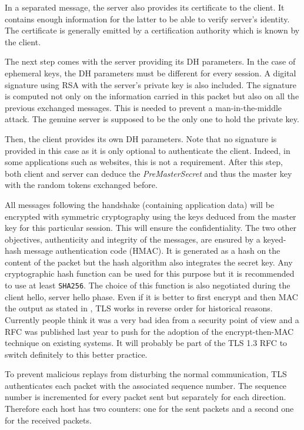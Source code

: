 In a separated message, the server also provides its certificate to the client. It contains enough information for the latter to be able to verify server's identity. The certificate is generally emitted by a certification authority which is known by the client.

The next step comes with the server providing its DH parameters. In the case of ephemeral keys, the DH parameters must be different for every session. A digital signature using RSA with the server's private key is also included. The signature is computed not only on the information carried in this packet but also on all the previous exchanged messages. This is needed to prevent a man-in-the-middle attack. The genuine server is supposed to be the only one to hold the private key.

Then, the client provides its own DH parameters. Note that no signature is provided in this case as it is only optional to authenticate the client. Indeed, in some applications such as websites, this is not a requirement. After this step, both client and server can deduce the \textit{PreMasterSecret} and thus the master key with the random tokens exchanged before.

All messages following the handshake (containing application data) will be encrypted with symmetric cryptography using the keys deduced from the master key for this particular session. This will ensure the confidentiality. The two other objectives, authenticity and integrity of the messages, are ensured by a keyed-hash message authentication code (HMAC). It is generated as a hash on the content of the packet but the hash algorithm also integrates the secret key. Any cryptographic hash function can be used for this purpose but it is recommended to use at least \texttt{SHA256}. The choice of this function is also negotiated during the client hello, server hello phase. Even if it is better to first encrypt and then MAC the output as stated in \cite{bellare2000authenticated}, TLS works in reverse order for historical reasons. Currently people think it was a very bad idea from a security point of view and a RFC \cite{rfc7366} was published last year to push for the adoption of the encrypt-then-MAC technique on existing systems. It will probably be part of the TLS 1.3 RFC \cite{draft-tls13} to switch definitely to this better practice.

To prevent malicious replays from disturbing the normal communication, TLS authenticates each packet with the associated sequence number. The sequence number is incremented for every packet sent but separately for each direction. Therefore each host has two counters: one for the sent packets and a second one for the received packets.

